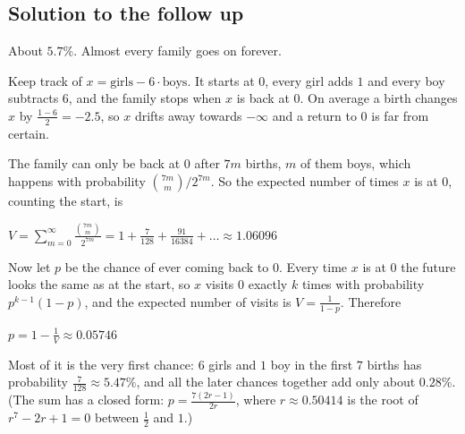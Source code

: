 \subsection{Solution to the follow up}

About $5.7\%$. Almost every family goes on forever.

Keep track of $x = \textrm{girls} - 6\cdot\textrm{boys}$. It starts at $0$, every girl adds $1$ and every boy subtracts $6$,
and the family stops when $x$ is back at $0$. On average a birth changes $x$ by $\frac{1-6}{2} = -2.5$,
so $x$ drifts away towards $-\infty$ and a return to $0$ is far from certain.

The family can only be back at $0$ after $7m$ births, $m$ of them boys, which happens with probability $\binom{7m}{m}/2^{7m}$.
So the expected number of times $x$ is at $0$, counting the start, is
\begin{center}
$V = \sum_{m=0}^{\infty} \frac{\binom{7m}{m}}{2^{7m}} = 1 + \frac{7}{128} + \frac{91}{16384} + \ldots \approx 1.06096$
\end{center}
Now let $p$ be the chance of ever coming back to $0$. Every time $x$ is at $0$ the future looks the same as at the start,
so $x$ visits $0$ exactly $k$ times with probability $p^{k-1}(1-p)$, and the expected number of visits is $V = \frac{1}{1-p}$.
Therefore
\begin{center}
$p = 1 - \frac{1}{V} \approx 0.05746$
\end{center}
Most of it is the very first chance: $6$ girls and $1$ boy in the first $7$ births has probability $\frac{7}{128} \approx 5.47\%$,
and all the later chances together add only about $0.28\%$.
(The sum has a closed form: $p = \frac{7(2r-1)}{2r}$, where $r \approx 0.50414$ is the root of $r^7 - 2r + 1 = 0$ between $\frac{1}{2}$ and $1$.)
